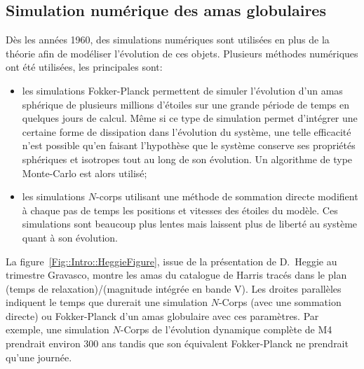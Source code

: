 		\subsection{Simulation numérique des amas globulaires}

			Dès les années 1960, des simulations numériques sont utilisées en plus de la théorie afin de modéliser l'évolution de ces
			objets. Plusieurs méthodes numériques ont été utilisées, les principales sont:
			\begin{itemize}

					\item les simulations Fokker-Planck permettent de
						simuler l'évolution d'un amas sphérique de plusieurs millions
						d'étoiles sur une grande période de temps en quelques
						jours de calcul. Même si ce type de simulation permet d'intégrer une
						certaine forme de dissipation dans l'évolution du système, une telle
						efficacité n'est possible qu'en faisant l'hypothèse que le système
						conserve ses propriétés sphériques et isotropes tout au long de son
						évolution.%
						Un algorithme de type Monte-Carlo est alors utilisé;


					\item les simulations $N$-corps utilisant une méthode de sommation directe modifient à chaque pas de
						temps les positions et vitesses des étoiles du modèle. Ces simulations sont beaucoup plus lentes mais
						laissent plus de liberté au système quant à son évolution.


			\end{itemize}
			La figure~\ref{Fig::Intro::HeggieFigure}, issue de la présentation de D.~Heggie au trimestre Gravasco, montre les amas du
			catalogue de Harris tracés dans le plan (temps de relaxation)/(magnitude intégrée en bande V). Les droites parallèles
			indiquent le temps que durerait une simulation $N$-Corps (avec une sommation directe) ou Fokker-Planck d'un amas globulaire
			avec ces paramètres. Par exemple, une simulation $N$-Corps de l'évolution dynamique complète de M4 prendrait environ 300 ans
			tandis que son équivalent Fokker-Planck ne prendrait qu'une journée.

